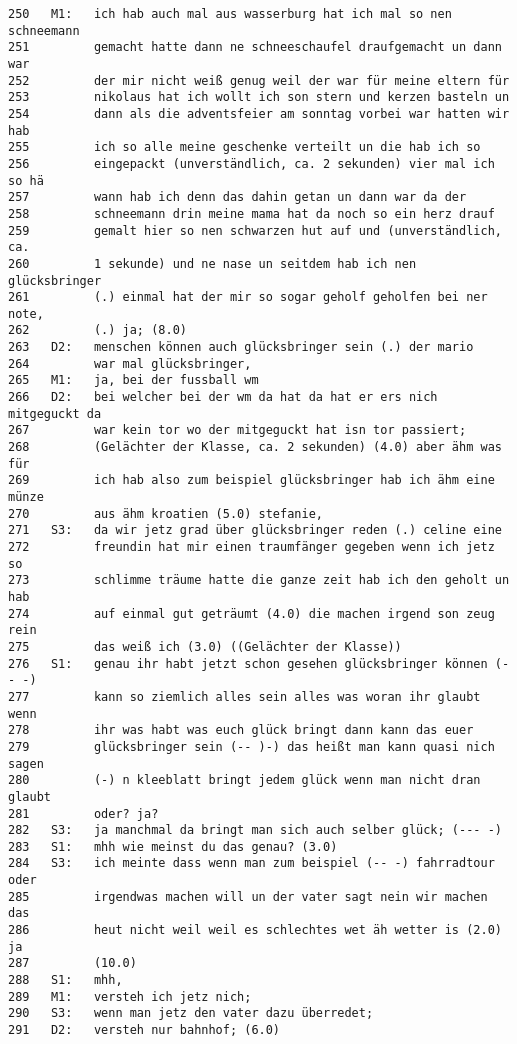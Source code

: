 \begin{lstlisting}[language={}]
250   M1:   ich hab auch mal aus wasserburg hat ich mal so nen schneemann 
251         gemacht hatte dann ne schneeschaufel draufgemacht un dann war 
252         der mir nicht weiß genug weil der war für meine eltern für 
253         nikolaus hat ich wollt ich son stern und kerzen basteln un 
254         dann als die adventsfeier am sonntag vorbei war hatten wir hab 
255         ich so alle meine geschenke verteilt un die hab ich so 
256         eingepackt (unverständlich, ca. 2 sekunden) vier mal ich so hä  
257         wann hab ich denn das dahin getan un dann war da der 
258         schneemann drin meine mama hat da noch so ein herz drauf 
259         gemalt hier so nen schwarzen hut auf und (unverständlich, ca. 
260         1 sekunde) und ne nase un seitdem hab ich nen glücksbringer 
261         (.) einmal hat der mir so sogar geholf geholfen bei ner note, 
262         (.) ja; (8.0)
263   D2:   menschen können auch glücksbringer sein (.) der mario 
264         war mal glücksbringer,
265   M1:   ja, bei der fussball wm
266   D2:   bei welcher bei der wm da hat da hat er ers nich mitgeguckt da 
267         war kein tor wo der mitgeguckt hat isn tor passiert; 
268         (Gelächter der Klasse, ca. 2 sekunden) (4.0) aber ähm was für 
269         ich hab also zum beispiel glücksbringer hab ich ähm eine münze  
270         aus ähm kroatien (5.0) stefanie,
271   S3:   da wir jetz grad über glücksbringer reden (.) celine eine  
272         freundin hat mir einen traumfänger gegeben wenn ich jetz so    
273         schlimme träume hatte die ganze zeit hab ich den geholt un hab 
274         auf einmal gut geträumt (4.0) die machen irgend son zeug rein 
275         das weiß ich (3.0) ((Gelächter der Klasse))
276   S1:   genau ihr habt jetzt schon gesehen glücksbringer können (-- -) 
277         kann so ziemlich alles sein alles was woran ihr glaubt wenn 
278         ihr was habt was euch glück bringt dann kann das euer 
279         glücksbringer sein (-- )-) das heißt man kann quasi nich sagen 
280         (-) n kleeblatt bringt jedem glück wenn man nicht dran glaubt 
281         oder? ja?
282   S3:   ja manchmal da bringt man sich auch selber glück; (--- -)
283   S1:   mhh wie meinst du das genau? (3.0)
284   S3:   ich meinte dass wenn man zum beispiel (-- -) fahrradtour oder 
285         irgendwas machen will un der vater sagt nein wir machen das    
286         heut nicht weil weil es schlechtes wet äh wetter is (2.0) ja 
287         (10.0)
288   S1:   mhh,
289   M1:   versteh ich jetz nich;
290   S3:   wenn man jetz den vater dazu überredet;
291   D2:   versteh nur bahnhof; (6.0)

\end{lstlisting}
